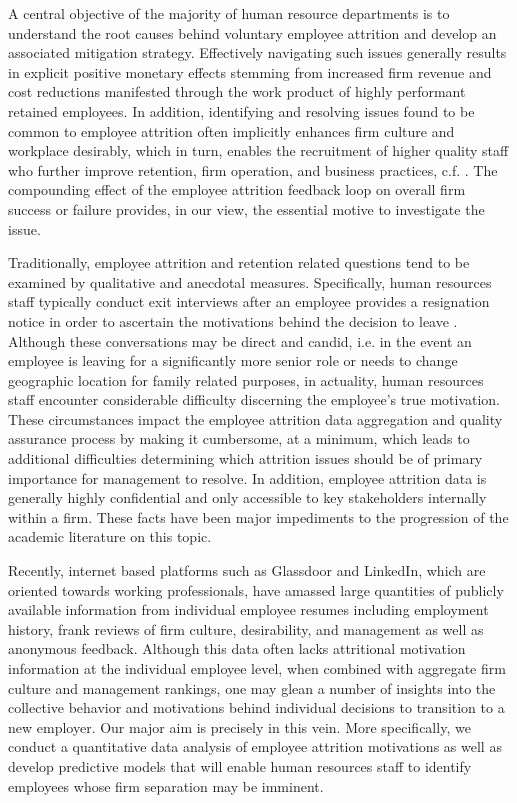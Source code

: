 \documentclass[10pt]{article}
\begin{document}
A central objective of the majority of human resource departments is to understand the root causes 
behind voluntary employee attrition and develop an associated mitigation strategy.  Effectively 
navigating such issues generally results in explicit positive monetary effects stemming from increased 
firm revenue and cost reductions manifested through the work product of highly performant retained employees. 
In addition, identifying and resolving issues found to be common to employee attrition often implicitly 
enhances firm culture and workplace desirably, which in turn, enables the recruitment of higher quality 
staff who further improve retention, firm operation, and business practices, c.f.  \cite{Cook1986,Free1994}.  
The compounding effect of the employee attrition feedback loop on overall firm
success or failure provides, in our view, the essential motive to 
investigate the issue. 

Traditionally, employee attrition and retention related questions tend to be examined by qualitative and anecdotal 
measures.  Specifically, human resources staff typically conduct exit interviews after an employee provides 
a resignation notice in order to ascertain the motivations behind the decision to leave \cite{Giac1991}.  Although 
these conversations may be direct and candid, i.e. in the event an employee is leaving for a significantly 
more senior role or needs to change geographic location for family related purposes, in actuality, human resources staff
encounter considerable difficulty discerning the employee's true motivation.  
These circumstances impact the employee attrition data aggregation and quality assurance process 
by making it cumbersome, at a minimum, which leads to additional difficulties determining which 
attrition issues should be of primary importance for management to resolve. In addition, employee 
attrition data is generally highly confidential and only accessible to key stakeholders internally 
within a firm.  These facts have been major impediments to the progression of the academic literature on 
this topic. 

Recently, internet based platforms such as Glassdoor and LinkedIn, which are oriented towards working 
professionals, have amassed large quantities of publicly available information from individual 
employee resumes including employment history, frank reviews of firm culture, desirability, and management
as well as anonymous feedback.  Although this data often lacks attritional motivation information at 
the individual employee level, when combined with aggregate firm culture and management rankings, 
one may glean a number of insights into the collective behavior and motivations behind individual 
decisions to transition to a new employer. Our major aim is precisely in this vein.  More specifically, 
we conduct a quantitative data analysis of employee attrition motivations as well as develop 
predictive models that will enable human resources staff to identify employees whose firm separation 
may be imminent.
\end{document}
